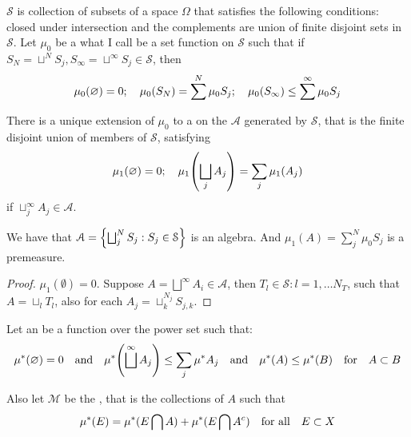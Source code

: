  \(\mathcal{S}\) is collection of subsets of a space \(\Omega\) that satisfies the following conditions: closed under intersection and the complements are union of finite disjoint sets in \(\mathcal{S}\). Let \(\mu_{0}\) be a what I call  be a set function on \(\mathcal{S}\) such that if \(S_{N} = \sqcup^{N}S_{j}, S_{\infty} = \sqcup^{\infty}S_{j} \in \mathcal{S}\), then
\begin{equation*}
    \mu_{0}(\emptyset) = 0 ; \quad \mu_{0}\pqty{S_{N}} = \sum^{N} \mu_{0}S_{j}; \quad  \mu_{0}\pqty{S_{\infty}} \leq \sum^{\infty} \mu_{0}S_{j}
\end{equation*} 

There is a unique extension of \(\mu_{0}\) to a  on the  \(\mathcal{A}\) generated by \(\mathcal{S}\), that is the finite disjoint union of members of \(\mathcal{S}\), satisfying 
\begin{equation*}
    \mu_{1}\pqty{\emptyset} = 0; \quad \mu_{1}\pqty{\sqcup_{j} A_{j}} = \sum_{j} \mu_{1}\pqty{A_{j}}
\end{equation*}
if \(\sqcup_{j}^{\infty} A_{j} \in \mathcal{A}\). 



\begin{thm}
    We have that \(\mathcal{A} = \Bqty{\bigsqcup^{N}_{j} S_{j} : S_{j} \in \mathcal{S}}\) is an algebra. And \(\mu_{1}(A) = \sum^{N}_{j} \mu_{0} S_{j}\) is a premeasure. 
\end{thm}

\begin{proof}
    \(\mu_{1}(\emptyset) = 0\). Suppose \(A = \bigsqcup^{\infty} A_{i} \in \mathcal{A}\), then  \(T_{l}\in \mathcal{S}: l = 1,\dots N_T\), such that \(A = \sqcup_{l} T_{l}\), also for each \(A_{j} = \sqcup^{N_{j}}_{k} S_{j,k}\). 
\end{proof}

Let an  be a function over the power set such that:
\begin{equation*}
    \mu^{*}(\emptyset)= 0 \qq{and} \mu^{*}\pqty{\sqcup^{\infty} A_{j}}\leq \sum_{j} \mu^{*} A_{j} \qq{and} \mu^{*}(A) \leq \mu^{*}(B)  \qq{for} A \subset B
\end{equation*}

Also let \(\mathcal{M}\) be the , that is the collections of \(A\) such that 
\begin{equation*}
    \mu^{*} (E) = \mu^{*}(E\cap A) + \mu^{*} (E\cap A^{c}) \qq{for all} E \subset X
\end{equation*}

